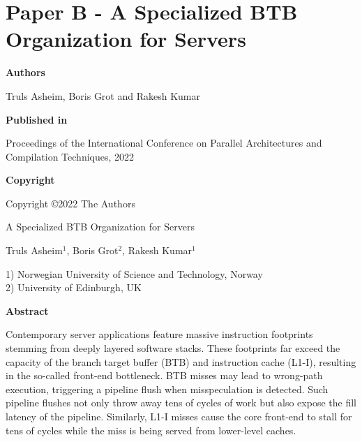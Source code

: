 \documentclass[../../../main.tex]{subfiles}
\begin{document}
\chapter{Paper B - A Specialized BTB Organization for Servers}

\noindent \textbf{Authors}

\vspace*{0.3cm}

\noindent Truls Asheim, Boris Grot and Rakesh Kumar

\vspace*{0.7cm}

\noindent \textbf{Published in}

\vspace*{0.3cm}

\noindent Proceedings of the International Conference on Parallel Architectures and Compilation Techniques, 2022

\vspace*{0.7cm}

\noindent \textbf{Copyright}

\vspace*{0.3cm}

\noindent Copyright ©2022 The Authors

\newpage

\vspace*{0.1cm}

\begin{center}

\Huge{A Specialized BTB Organization for Servers}

\vspace{0.6cm}

\large{Truls Asheim$^{1}$, Boris Grot$^{2}$, Rakesh Kumar$^{1}$}

\vspace{0.1cm}

\small{1) Norwegian University of Science and Technology, Norway}\\
\small{2) University of Edinburgh, UK}


\end{center}

\vspace{0.2cm}

\begin{center}
  \textbf{Abstract}
  \end{center}
\begin{changemargin}{0.75cm}{0.75cm}
Contemporary server applications feature massive instruction footprints stemming from deeply layered software stacks. These footprints far exceed the capacity of the branch target buffer (BTB) and instruction cache (L1-I), resulting in the so-called front-end bottleneck. BTB misses may lead to wrong-path execution, triggering a pipeline flush when misspeculation is detected. Such pipeline flushes not only throw away tens of cycles of work but also expose the fill latency of the pipeline. Similarly, L1-I misses cause the core front-end to stall for tens of cycles while the miss is being served from lower-level caches.
\end{changemargin}

\vspace{1cm}

\begin{refsection}
  
  \printbibliography[heading=refs2]
\end{refsection}
\FloatBarrier
\end{document}
